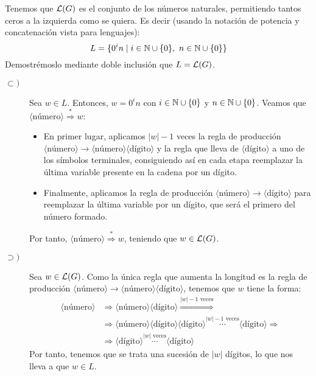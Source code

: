 \begin{ejercicio}
\begin{enumerate}
        Tenemos que $\mathcal{L}(G)$ es el conjunto de los números naturales, permitiendo
        tantos ceros a la izquierda como se quiera. Es decir (usando la notación de potencia y concatenación vista para lenguajes):
        \begin{equation*}
            L = \{0^i n \mid i\in \mathbb{N}\cup\{0\},~n\in \mathbb{N}\cup \{0\}\}
        \end{equation*}
        Demostrémoslo mediante doble inclusión que $L=\mathcal{L}(G)$.
        \begin{description}
            \item[$\subset)$] Sea $w\in L$. Entonces, $w=0^i n$ con $i\in \mathbb{N}\cup\{0\}$ y $n\in \mathbb{N}\cup \{0\}$. Veamos que
            $\langle \text{número} \rangle \stackrel{\ast}{\Longrightarrow} w$:
            \begin{itemize}
                \item En primer lugar, aplicamos $|w|-1$ veces la regla de producción $\langle \text{número} \rangle \rightarrow \langle \text{número} \rangle \langle \text{dígito} \rangle$ y la regla
                que lleva de $\langle \text{dígito} \rangle$ a uno de los símbolos terminales, consiguiendo así en cada etapa reemplazar
                la última variable presente en la cadena por un dígito.
                \item Finalmente, aplicamos la regla de producción $\langle \text{número} \rangle \rightarrow \langle \text{dígito} \rangle$ para reemplazar la última variable por un dígito, que será el primero del número formado.
            \end{itemize}
            Por tanto, $\langle \text{número} \rangle \stackrel{\ast}{\Longrightarrow} w$, teniendo que $w\in \mathcal{L}(G)$.

            \item[$\supset)$] Sea $w\in\mathcal{L}(G)$. Como la única regla que
            aumenta la longitud es la regla de producción $\langle \text{número} \rangle \rightarrow \langle \text{número} \rangle \langle \text{dígito} \rangle$, tenemos que $w$ tiene la forma:
            \begin{align*}
                \langle \text{número} \rangle &\Longrightarrow \langle \text{número} \rangle \langle \text{dígito} \rangle \stackrel{|w|-1\text{\ veces}}{\Longrightarrow} \\
                &\Longrightarrow
                \langle \text{número} \rangle \langle \text{dígito} \rangle \langle \text{dígito} \rangle \stackrel{|w|-1\text{\ veces}}{\cdots} \langle \text{dígito} \rangle
                \Longrightarrow \\& \Longrightarrow
                \langle \text{dígito} \rangle \stackrel{|w|\text{\ veces}}{\cdots} \langle \text{dígito} \rangle
            \end{align*}
            Por tanto, tenemos que se trata una sucesión de $|w|$ dígitos, lo que nos lleva a que $w\in L$.
        \end{description}


\end{enumerate}
\end{ejercicio}
